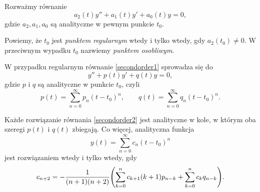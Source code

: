 %
Rozważmy równanie
%
\begin{equation} \label{secondorder1}
  a_2(t) y'' + a_1(t)y' + a_0(t)y = 0,
\end{equation}
%
gdzie $a_2,a_1,a_0$ są analityczne w pewnym punkcie $t_0$.
%
\begin{definition}
  Powiemy, że $t_0$ jest \emph{punktem regularnym} wtedy i tylko wtedy, gdy $a_2(t_0) \not= 0$. W przeciwnym wypadku 
  $t_0$ nazwiemy \emph{punktem osobliwym}.
\end{definition}
%
W przypadku regularnym równanie \eqref{secondorder1} sprowadza się do
%
\begin{equation} \label{secondorder2}
  y'' + p(t)y' + q(t)y = 0,
\end{equation}
%
gdzie $p$ i $q$ są analityczne w punkcie $t_0$, czyli
%
\begin{equation*}
  p(t) = \sum_{n=0}^{\infty} p_n(t-t_0)^n, \qquad q(t) = \sum_{n=0}^{\infty} q_n(t-t_0)^n.
\end{equation*}
%
\begin{theorem}
  Każde rozwiązanie równania \eqref{secondorder2} jest analityczne w kole, w którym oba szeregi $p(t)$ i $q(t)$ 
  zbiegają. Co więcej, analityczna funkcja
%
  \begin{equation*}
    y(t) = \sum_{n=0}^{\infty}c_n(t - t_0)^n
  \end{equation*}
%
  jest rozwiązaniem wtedy i tylko wtedy, gdy
%
  \begin{equation} \label{rps}
    c_{n+2} = - \frac{1}{(n+1)(n+2)} \p*{ \sum_{k=0}^{n} c_{k+1}(k+1)p_{n-k} + \sum_{k=0}^{n} c_k q_{n-k} }.
  \end{equation}
%
\end{theorem}
%
